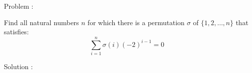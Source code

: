 Problem : 

Find all natural numbers $n$ for which there is a permutation $\sigma$ of $\{1,2,\ldots, n\}$ that satisfies:
\[ \sum_{i=1}^n \sigma(i)(-2)^{i-1}=0 \]

Solution :

